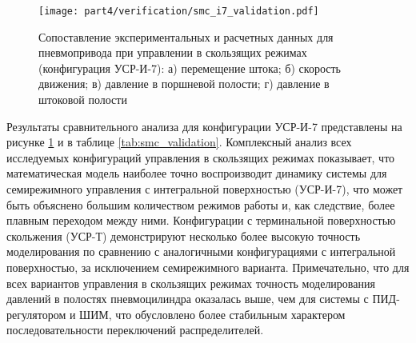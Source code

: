 \begin{figure}[ht]
	\centering
	\texttt{[image: part4/verification/smc\_i7\_validation.pdf]}
	\caption{Сопоставление экспериментальных и расчетных данных для пневмопривода при управлении в скользящих режимах
		(конфигурация УСР-И-7): а) перемещение штока; б) скорость движения; в) давление в поршневой полости; г) давление в штоковой полости}
	\label{fig:smc_i7_validation}
\end{figure}

Результаты сравнительного анализа для конфигурации УСР-И-7 представлены на
рисунке \ref{fig:smc_i7_validation} и в таблице \ref{tab:smc_validation}.
Комплексный анализ всех исследуемых конфигураций управления в скользящих режимах
показывает, что математическая модель наиболее точно воспроизводит динамику системы
для семирежимного управления с интегральной поверхностью (УСР-И-7), что может быть
объяснено большим количеством режимов работы и, как следствие, более плавным переходом
между ними. Конфигурации с терминальной поверхностью скольжения (УСР-Т) демонстрируют
несколько более высокую точность моделирования по сравнению с аналогичными конфигурациями
с интегральной поверхностью, за исключением семирежимного варианта. Примечательно, что для
всех вариантов управления в скользящих режимах точность моделирования давлений в полостях
пневмоцилиндра оказалась выше, чем для системы с ПИД-регулятором и ШИМ, что обусловлено
более стабильным характером последовательности переключений распределителей.


